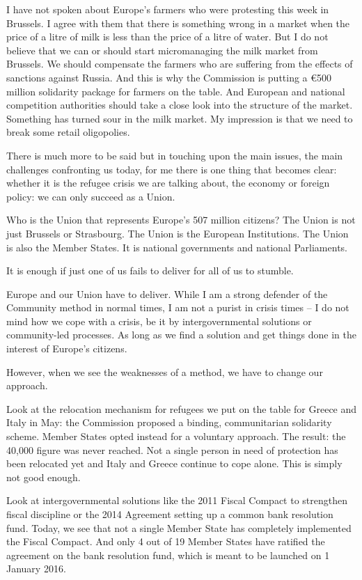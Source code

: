 \documentclass[a4paper,11pt]{article}
\begin{document}
I have not spoken about Europe's farmers who were protesting this week in Brussels. I agree with them that there is something wrong in a market when the price of a litre of milk is less than the price of a litre of water. But I do not believe that we can or should start micromanaging the milk market from Brussels. We should compensate the farmers who are suffering from the effects of sanctions against Russia. And this is why the Commission is putting a \euro500 million solidarity package for farmers on the table. And European and national competition authorities should take a close look into the structure of the market. Something has turned sour in the milk market. My impression is that we need to break some retail oligopolies.

There is much more to be said but in touching upon the main issues, the main challenges confronting us today, for me there is one thing that becomes clear: whether it is the refugee crisis we are talking about, the economy or foreign policy: we can only succeed as a Union.

Who is the Union that represents Europe's 507 million citizens? The Union is not just Brussels or Strasbourg. The Union is the European Institutions. The Union is also the Member States. It is national governments and national Parliaments.

It is enough if just one of us fails to deliver for all of us to stumble.

Europe and our Union have to deliver. While I am a strong defender of the Community method in normal times, I am not a purist in crisis times – I do not mind how we cope with a crisis, be it by intergovernmental solutions or community-led processes. As long as we find a solution and get things done in the interest of Europe's citizens.

However, when we see the weaknesses of a method, we have to change our approach.

Look at the relocation mechanism for refugees we put on the table for Greece and Italy in May: the Commission proposed a binding, communitarian solidarity scheme. Member States opted instead for a voluntary approach. The result: the 40,000 figure was never reached. Not a single person in need of protection has been relocated yet and Italy and Greece continue to cope alone. This is simply not good enough.

Look at intergovernmental solutions like the 2011 Fiscal Compact to strengthen fiscal discipline or the 2014 Agreement setting up a common bank resolution fund. Today, we see that not a single Member State has completely implemented the Fiscal Compact. And only 4 out of 19 Member States have ratified the agreement on the bank resolution fund, which is meant to be launched on 1 January 2016.
\end{document}
